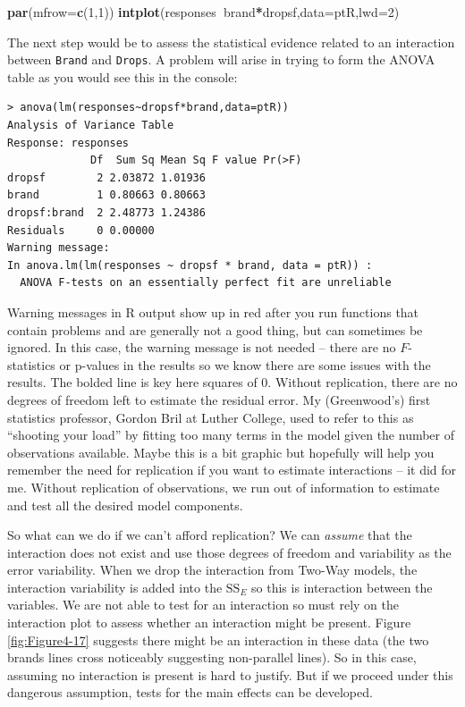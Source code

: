 \documentclass[]{book}
\newenvironment{Shaded}{\begin{snugshade}}{\end{snugshade}}
\newcommand{\KeywordTok}[1]{\textcolor[rgb]{0.13,0.29,0.53}{\textbf{#1}}}
\newcommand{\DataTypeTok}[1]{\textcolor[rgb]{0.13,0.29,0.53}{#1}}
\newcommand{\DecValTok}[1]{\textcolor[rgb]{0.00,0.00,0.81}{#1}}
\newcommand{\OperatorTok}[1]{\textcolor[rgb]{0.81,0.36,0.00}{\textbf{#1}}}
\newcommand{\NormalTok}[1]{#1}
\theoremstyle{definition}
\theoremstyle{definition}
\theoremstyle{remark}
\begin{document}
\begin{Shaded}
\begin{Highlighting}[]
\KeywordTok{par}\NormalTok{(}\DataTypeTok{mfrow=}\KeywordTok{c}\NormalTok{(}\DecValTok{1}\NormalTok{,}\DecValTok{1}\NormalTok{))}
\KeywordTok{intplot}\NormalTok{(responses}\OperatorTok{~}\NormalTok{brand}\OperatorTok{*}\NormalTok{dropsf,}\DataTypeTok{data=}\NormalTok{ptR,}\DataTypeTok{lwd=}\DecValTok{2}\NormalTok{)}
\end{Highlighting}
\end{Shaded}

The next step would be to assess the statistical evidence related to an
interaction between \texttt{Brand} and \texttt{Drops}. A problem will
arise in trying to form the ANOVA table as you would see this in the
console:

\small

\begin{verbatim}
> anova(lm(responses~dropsf*brand,data=ptR))
Analysis of Variance Table
Response: responses
             Df  Sum Sq Mean Sq F value Pr(>F)
dropsf        2 2.03872 1.01936               
brand         1 0.80663 0.80663               
dropsf:brand  2 2.48773 1.24386               
Residuals     0 0.00000                       
Warning message:
In anova.lm(lm(responses ~ dropsf * brand, data = ptR)) :
  ANOVA F-tests on an essentially perfect fit are unreliable
\end{verbatim}

\normalsize

Warning messages in R output show up in red after you run functions that
contain problems and are generally not a good thing, but can sometimes
be ignored. In this case, the warning message is not needed -- there are
no \(F\)-statistics or p-values in the results so we know there are some
issues with the results. The bolded line is key here squares of 0.
Without replication, there are no degrees of freedom left to estimate
the residual error. My (Greenwood's) first statistics professor, Gordon
Bril at Luther College, used to refer to this as ``shooting your load''
by fitting too many terms in the model given the number of observations
available. Maybe this is a bit graphic but hopefully will help you
remember the need for replication if you want to estimate interactions
-- it did for me. Without replication of observations, we run out of
information to estimate and test all the desired model components.

So what can we do if we can't afford replication? We can \emph{assume}
that the interaction does not exist and use those degrees of freedom and
variability as the error variability. When we drop the interaction from
Two-Way models, the interaction variability is added into the
\(\text{SS}_E\) so this is interaction between the variables. We are not
able to test for an interaction so must rely on the interaction plot to
assess whether an interaction might be present. Figure
\ref{fig:Figure4-17} suggests there might be an interaction in these
data (the two brands lines cross noticeably suggesting non-parallel
lines). So in this case, assuming no interaction is present is hard to
justify. But if we proceed under this dangerous assumption, tests for
the main effects can be developed.
\end{document}
